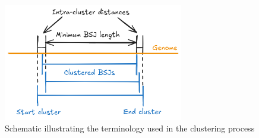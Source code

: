 \begin{figure}[ht]
    \centering

    \includegraphics[width=0.7\textwidth]{chapters/4_results_and_discussion/figures/grouping.png}
    \caption{Schematic illustrating the terminology used in the
        clustering process}
    \label{fig:clustering_expl}
\end{figure}

